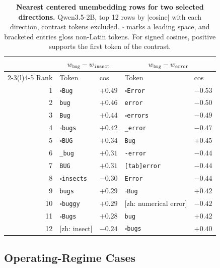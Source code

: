\begin{table}[!tbp]
\caption{\textbf{Nearest centered unembedding rows for two selected
directions.} Qwen3.5-2B, top 12 rows by \(|\)cosine\(|\) with each
direction, contrast tokens excluded. \(\square\) marks a leading space, and
bracketed entries gloss non-Latin tokens. For signed cosines, positive
supports the first token of the contrast.}
\label{tab:app-nearest-rows}
\centering
\scriptsize
\setlength{\tabcolsep}{2.4pt}
\renewcommand{\arraystretch}{1.08}
\begin{tabular}{@{}r ll ll@{}}
\toprule
& \multicolumn{2}{c}{\(w_{\texttt{bug}}-w_{\texttt{insect}}\)}
& \multicolumn{2}{c}{\(w_{\texttt{bug}}-w_{\texttt{error}}\)} \\
\cmidrule(lr){2-3}\cmidrule(l){4-5}
Rank & Token & cos & Token & cos \\
\midrule
1  & \texttt{\(\square\)Bug}     & \(+0.49\) & \texttt{\(\square\)Error}  & \(-0.53\) \\
2  & \texttt{bug}                & \(+0.46\) & \texttt{error}             & \(-0.50\) \\
3  & \texttt{Bug}                & \(+0.44\) & \texttt{\(\square\)errors} & \(-0.49\) \\
4  & \texttt{\(\square\)bugs}    & \(+0.42\) & \texttt{\_error}           & \(-0.47\) \\
5  & \texttt{\(\square\)BUG}     & \(+0.34\) & \texttt{Bug}               & \(+0.45\) \\
6  & \texttt{\_bug}              & \(+0.31\) & \texttt{-error}            & \(-0.44\) \\
7  & \texttt{BUG}                & \(+0.31\) & \texttt{[tab]error}        & \(-0.44\) \\
8  & \texttt{\(\square\)insects} & \(-0.30\) & \texttt{Error}             & \(-0.44\) \\
9  & \texttt{bugs}               & \(+0.29\) & \texttt{\(\square\)Bug}    & \(+0.42\) \\
10 & \texttt{\(\square\)buggy}   & \(+0.29\) & [zh: numerical error]      & \(-0.42\) \\
11 & \texttt{\(\square\)Bugs}    & \(+0.28\) & \texttt{bug}               & \(+0.42\) \\
12 & [zh: insect]                & \(-0.24\) & \texttt{\(\square\)bugs}   & \(+0.40\) \\
\bottomrule
\end{tabular}
\end{table}

\subsection{Operating-Regime Cases}
\label{app:robustness-operating-regime}
\label{subsec:interpretation-boundary}

